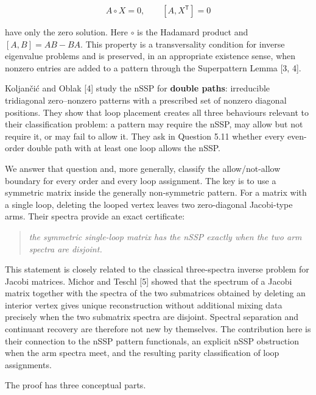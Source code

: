 \documentclass[11pt]{article}
\theoremstyle{remark}
\begin{document}
\[
  A\circ X=0,
  \qquad
  [A,X^{\mathsf T}]=0
\]

have only the zero solution. Here $\circ$ is the Hadamard product and
$[A,B]=AB-BA$. This property is a transversality condition for inverse eigenvalue problems and is
preserved, in an appropriate existence sense, when nonzero entries are added to a pattern through the
Superpattern Lemma [3, 4].

Koljan\v{c}i\'{c} and Oblak [4] study the nSSP for \textbf{double paths}: irreducible tridiagonal zero--nonzero
patterns with a prescribed set of nonzero diagonal positions. They show that loop placement creates all
three behaviours relevant to their classification problem: a pattern may require the nSSP, may allow but
not require it, or may fail to allow it. They ask in Question 5.11 whether every even-order double path
with at least one loop allows the nSSP.

We answer that question and, more generally, classify the allow/not-allow boundary for every order and
every loop assignment. The key is to use a symmetric matrix inside the generally non-symmetric pattern.
For a matrix with a single loop, deleting the looped vertex leaves two zero-diagonal Jacobi-type arms.
Their spectra provide an exact certificate:

\begin{quote}
\emph{the symmetric single-loop matrix has the nSSP exactly when the two arm spectra are disjoint.}
\end{quote}

This statement is closely related to the classical three-spectra inverse problem for Jacobi matrices.
Michor and Teschl [5] showed that the spectrum of a Jacobi matrix together with the spectra of the two
submatrices obtained by deleting an interior vertex gives unique reconstruction without additional mixing
data precisely when the two submatrix spectra are disjoint. Spectral separation and continuant recovery
are therefore not new by themselves. The contribution here is their connection to the nSSP pattern
functionals, an explicit nSSP obstruction when the arm spectra meet, and the resulting parity
classification of loop assignments.

The proof has three conceptual parts.
\end{document}
